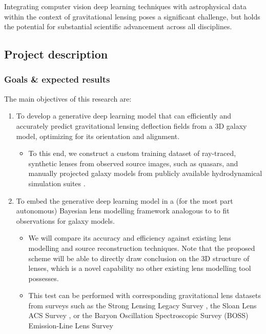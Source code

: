 \documentclass[a4paper,10pt]{article}
\begin{document}
Integrating computer vision deep learning techniques with
astrophysical data within the context of gravitational lensing poses a
significant challenge, but holds the potential for substantial
scientific advancement across all disciplines.

\subsection{Project description}
\label{sec:orge500194}

\subsubsection{Goals \& expected results}
\label{sec:orgdbde803}
\label{sec:goals}

The main objectives of this research are:
\begin{enumerate}[leftmargin=*, noitemsep]
\item To develop a generative deep learning model that can efficiently
and accurately predict gravitational lensing deflection fields from
a 3D galaxy model, optimizing for its orientation and alignment.
\begin{itemize}[leftmargin=*]
\item To this end, we construct a custom training dataset of
ray-traced, synthetic lenses from observed source images, such as
quasars, and manually projected galaxy models from publicly
available hydrodynamical simulation suites
\citep{Springel17,Nelson18,Dave19}.
\end{itemize}
\item To embed the generative deep learning model in a (for the most part
autonomous) Bayesian lens modelling framework analogous to
\cite{Adam22,Denzel21,Morningstar19,Hezaveh17} to fit
observations for galaxy models.
\begin{itemize}[leftmargin=*]
\item We will compare its accuracy and efficiency against existing lens
modelling and source reconstruction techniques. Note that the
proposed scheme will be able to directly draw conclusion on the
3D structure of lenses, which is a novel capability no other
existing lens modelling tool possesses.
\item This test can be performed with corresponding gravitational lens
datasets from surveys such as the Strong Lensing Legacy Survey
\citep[SL2S:][]{Gavazzi12,Sonnenfeld15}, the Sloan Lens ACS
Survey \citep[SLACS:][]{Bolton2006,Shu17}, or the Baryon
Oscillation Spectroscopic Survey (BOSS) Emission-Line Lens Survey

\end{itemize}
\end{enumerate}
\end{document}
